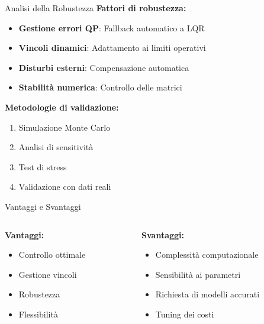 \documentclass[beamer]{beamer}
\begin{document}
\begin{frame}{Analisi della Robustezza}
    \textbf{Fattori di robustezza:}
    \begin{itemize}
        \item \textbf{Gestione errori QP}: Fallback automatico a LQR
        \item \textbf{Vincoli dinamici}: Adattamento ai limiti operativi
        \item \textbf{Disturbi esterni}: Compensazione automatica
        \item \textbf{Stabilità numerica}: Controllo delle matrici
    \end{itemize}
    
    \textbf{Metodologie di validazione:}
    \begin{enumerate}
        \item Simulazione Monte Carlo
        \item Analisi di sensitività
        \item Test di stress
        \item Validazione con dati reali
    \end{enumerate}
\end{frame}

\begin{frame}{Vantaggi e Svantaggi}
    \begin{columns}
        \begin{column}{0.5\textwidth}
            \textbf{Vantaggi:}
            \begin{itemize}
                \item Controllo ottimale
                \item Gestione vincoli
                \item Robustezza
                \item Flessibilità
            \end{itemize}
        \end{column}
        \begin{column}{0.5\textwidth}
            \textbf{Svantaggi:}
            \begin{itemize}
                \item Complessità computazionale
                \item Sensibilità ai parametri
                \item Richiesta di modelli accurati
                \item Tuning dei costi
            \end{itemize}
        \end{column}
    \end{columns}
\end{frame}
\end{document}
